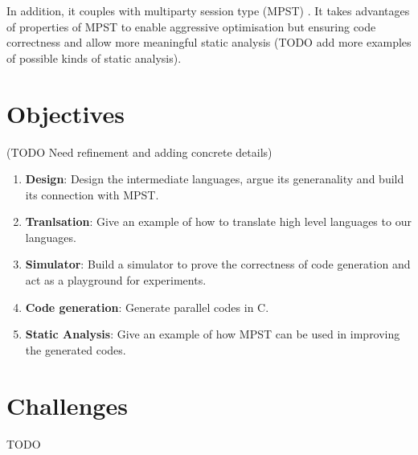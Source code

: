 In addition, it couples with multiparty session type (MPST) \cite{coppoGentleIntroductionMultiparty2015}. It takes advantages of properties of MPST to enable aggressive optimisation but ensuring code correctness and allow more meaningful static analysis (TODO add more examples of possible kinds of static analysis).

\section{Objectives}
(TODO Need refinement and adding concrete details)
\begin{enumerate}
\item \textbf{Design}: Design the intermediate languages, argue its generanality and build its connection with MPST. 
\item \textbf{Tranlsation}: Give an example of how to translate high level languages to our languages. 
\item \textbf{Simulator}: Build a simulator to prove the correctness of code generation and act as a playground for experiments.
\item \textbf{Code generation}: Generate parallel codes in C.
\item \textbf{Static Analysis}: Give an example of how MPST can be used in improving the generated codes.
\end{enumerate}
\section{Challenges}
TODO
